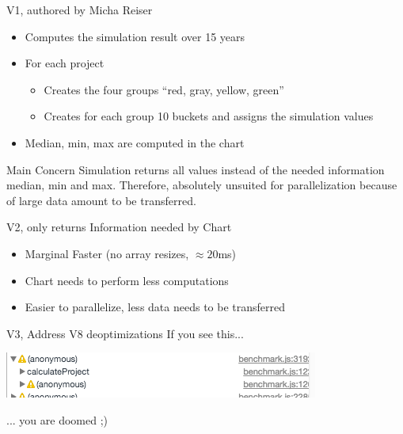 \begin{frame}{V1, authored by Micha Reiser}
	\begin{itemize}
		\item Computes the simulation result over 15 years
		\item For each project
		\begin{itemize}
			\item Creates the four groups \enquote{red, gray, yellow, green}
			\item Creates for each group 10 buckets and assigns the simulation values
		\end{itemize}
		\item Median, min, max are computed in the chart
	\end{itemize}
	
	\begin{alertblock}{Main Concern}
		Simulation returns all values instead of the needed information median, min and max. Therefore, absolutely unsuited for parallelization because of large data amount to be transferred.
	\end{alertblock}

\end{frame}

\begin{frame}{V2, only returns Information needed by Chart}
	\begin{itemize}
		\item Marginal Faster (no array resizes, $\approx 20$ms)
		\item Chart needs to perform less computations
		\item Easier to parallelize, less data needs to be transferred
	\end{itemize}
\end{frame}

\begin{frame}{V3, Address V8 deoptimizations}
	If you see this...
	
	\includegraphics[scale=0.45]{deopt}
	
	... you are doomed ;)
\end{frame}

